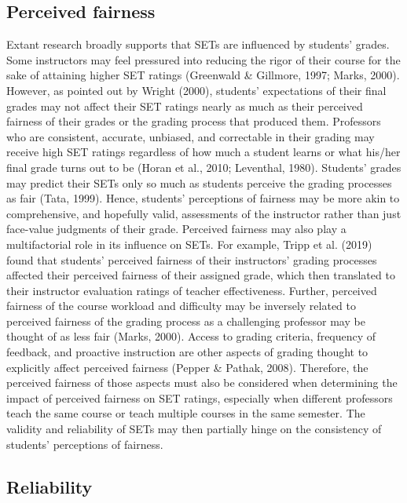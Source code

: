 \documentclass[
  man]{apa7}
\begin{document}
\hypertarget{perceived-fairness}{%
\subsection{Perceived fairness}\label{perceived-fairness}}

Extant research broadly supports that SETs are influenced by students'
grades. Some instructors may feel pressured into reducing the rigor of
their course for the sake of attaining higher SET ratings
(Greenwald \& Gillmore, 1997; Marks, 2000). However, as pointed out by Wright (2000),
students' expectations of their final grades may not affect their SET
ratings nearly as much as their perceived fairness of their grades or
the grading process that produced them. Professors who are consistent,
accurate, unbiased, and correctable in their grading may receive high
SET ratings regardless of how much a student learns or what his/her
final grade turns out to be (Horan et al., 2010; Leventhal, 1980). Students'
grades may predict their SETs only so much as students perceive the
grading processes as fair (Tata, 1999). Hence, students' perceptions of
fairness may be more akin to comprehensive, and hopefully valid,
assessments of the instructor rather than just face-value judgments of
their grade. Perceived fairness may also play a multifactorial role in
its influence on SETs. For example, Tripp et al. (2019) found that students'
perceived fairness of their instructors' grading processes affected
their perceived fairness of their assigned grade, which then translated
to their instructor evaluation ratings of teacher effectiveness.
Further, perceived fairness of the course workload and difficulty may be
inversely related to perceived fairness of the grading process as a
challenging professor may be thought of as less fair (Marks, 2000).
Access to grading criteria, frequency of feedback, and proactive
instruction are other aspects of grading thought to explicitly affect
perceived fairness (Pepper \& Pathak, 2008). Therefore, the perceived fairness of
those aspects must also be considered when determining the impact of
perceived fairness on SET ratings, especially when different professors
teach the same course or teach multiple courses in the same semester.
The validity and reliability of SETs may then partially hinge on the
consistency of students' perceptions of fairness.

\hypertarget{reliability}{%
\subsection{Reliability}\label{reliability}}
\end{document}
